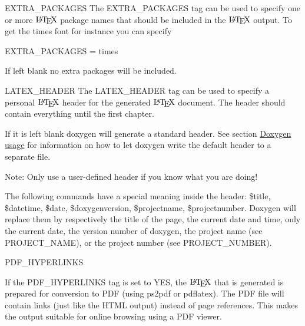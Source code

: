 \begin{DoxyDescription}
\label{config_cfg_extra_packages}
\hypertarget{config_cfg_extra_packages}{}
 
\item[{\ttfamily EXTRA\_\-PACKAGES} ] The {\ttfamily EXTRA\_\-PACKAGES} tag can be used to specify one or more $\mbox{\LaTeX}$ package names that should be included in the $\mbox{\LaTeX}$ output. To get the times font for instance you can specify \begin{DoxyVerb}
EXTRA_PACKAGES = times
\end{DoxyVerb}
 If left blank no extra packages will be included.

\label{config_cfg_latex_header}
\hypertarget{config_cfg_latex_header}{}
 
\item[{\ttfamily LATEX\_\-HEADER} ] The {\ttfamily LATEX\_\-HEADER} tag can be used to specify a personal $\mbox{\LaTeX}$ header for the generated $\mbox{\LaTeX}$ document. The header should contain everything until the first chapter.

If it is left blank doxygen will generate a standard header. See section \hyperlink{doxygen_usage}{Doxygen usage} for information on how to let doxygen write the default header to a separate file.

\begin{DoxyParagraph}{Note: }
Only use a user-\/defined header if you know what you are doing!
\end{DoxyParagraph}
The following commands have a special meaning inside the header: {\ttfamily \$title}, {\ttfamily \$datetime}, {\ttfamily \$date}, {\ttfamily \$doxygenversion}, {\ttfamily \$projectname}, {\ttfamily \$projectnumber}. Doxygen will replace them by respectively the title of the page, the current date and time, only the current date, the version number of doxygen, the project name (see {\ttfamily PROJECT\_\-NAME}), or the project number (see {\ttfamily PROJECT\_\-NUMBER}).

\label{config_cfg_pdf_hyperlinks}
\hypertarget{config_cfg_pdf_hyperlinks}{}
 
\item[{\ttfamily PDF\_\-HYPERLINKS} ]

If the {\ttfamily PDF\_\-HYPERLINKS} tag is set to {\ttfamily YES}, the $\mbox{\LaTeX}$ that is generated is prepared for conversion to PDF (using ps2pdf or pdflatex). The PDF file will contain links (just like the HTML output) instead of page references. This makes the output suitable for online browsing using a PDF viewer.


\end{DoxyDescription}
